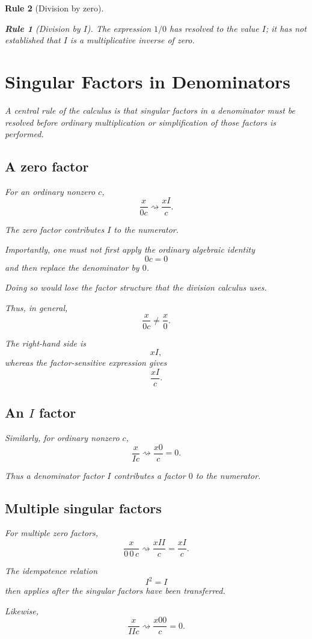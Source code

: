 \documentclass[11pt,a4paper]{article}
\newtheorem{rulethm}{Rule}[section]
\begin{document}
\begin{rulethm}[Division by zero]
\begin{rulethm}[Division by $I$]
The expression $1/0$ has resolved to the value $I$; it has not established
that $I$ is a multiplicative inverse of zero.

\section{Singular Factors in Denominators}

A central rule of the calculus is that singular factors in a denominator
must be resolved before ordinary multiplication or simplification of those
factors is performed.

\subsection{A zero factor}

For an ordinary nonzero $c$,
\[
\frac{x}{0c}
\rightsquigarrow
\frac{xI}{c}.
\]

The zero factor contributes $I$ to the numerator.

Importantly, one must not first apply the ordinary algebraic identity
\[
0c=0
\]
and then replace the denominator by $0$.

Doing so would lose the factor structure that the division calculus uses.

Thus, in general,
\[
\frac{x}{0c}\neq\frac{x}{0}.
\]

The right-hand side is
\[
xI,
\]
whereas the factor-sensitive expression gives
\[
\frac{xI}{c}.
\]

\subsection{An $I$ factor}

Similarly, for ordinary nonzero $c$,
\[
\frac{x}{Ic}
\rightsquigarrow
\frac{x0}{c}
=0.
\]

Thus a denominator factor $I$ contributes a factor $0$ to the numerator.

\subsection{Multiple singular factors}

For multiple zero factors,
\[
\frac{x}{0\,0\,c}
\rightsquigarrow
\frac{xII}{c}
=
\frac{xI}{c}.
\]

The idempotence relation
\[
I^2=I
\]
then applies after the singular factors have been transferred.

Likewise,
\[
\frac{x}{I I c}
\rightsquigarrow
\frac{x00}{c}
=0.
\]


\end{rulethm}
\end{rulethm}
\end{document}
